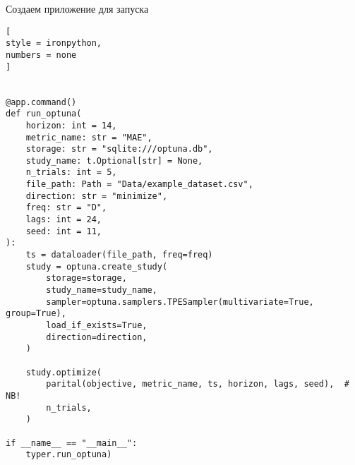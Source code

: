 \documentclass[%
	11pt,
	a4paper,
	utf8,
		]{article}
\begin{document}
Создаем приложение для запуска
\begin{lstlisting}[
style = ironpython,
numbers = none
]


@app.command()
def run_optuna(
    horizon: int = 14,
    metric_name: str = "MAE",
    storage: str = "sqlite:///optuna.db",
    study_name: t.Optional[str] = None,
    n_trials: int = 5,
    file_path: Path = "Data/example_dataset.csv",
    direction: str = "minimize",
    freq: str = "D",
    lags: int = 24,
    seed: int = 11,
):
    ts = dataloader(file_path, freq=freq)
    study = optuna.create_study(
        storage=storage,
        study_name=study_name,
        sampler=optuna.samplers.TPESampler(multivariate=True, group=True),
        load_if_exists=True,
        direction=direction,
    )
    
    study.optimize(
        parital(objective, metric_name, ts, horizon, lags, seed),  # NB!
        n_trials,
    )
    
if __name__ == "__main__":
    typer.run_optuna)
\end{lstlisting}






\begin{thebibliography}{99}
	
\end{thebibliography}


\end{document}
